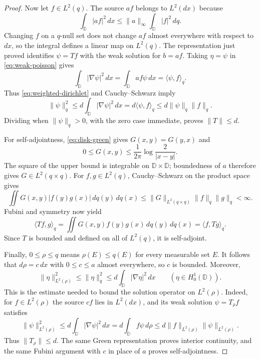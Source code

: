 \begin{proof}
Now let $f\in L^2(q)$. The source $af$ belongs to $L^2(dx)$ because
\[
 \int_{\mathbb D}|af|^2\,dx
 \le\|a\|_\infty\int_{\mathbb D}|f|^2\,dq.
\]
Changing $f$ on a $q$-null set does not change $af$ almost everywhere
with respect to $dx$, so the integral defines a linear map on $L^2(q)$.
The representation just proved identifies $\psi=Tf$ with the weak
solution for $b=af$. Taking $\eta=\psi$ in \cref{eq:weak-poisson}
gives
\[
 \int_{\mathbb D}|\nabla\psi|^2\,dx
 =\int_{\mathbb D}af\psi\,dx=\langle\psi,f\rangle_q.
\]
Thus \cref{eq:weighted-dirichlet} and Cauchy--Schwarz imply
\[
 \|\psi\|_q^2
 \le d\int_{\mathbb D}|\nabla\psi|^2\,dx
 =d\langle\psi,f\rangle_q
 \le d\|\psi\|_q\|f\|_q.
\]
Dividing when $\|\psi\|_q>0$, with the zero case immediate, proves
$\|T\|\le d$.

For self-adjointness, \cref{eq:disk-green} gives
$G(x,y)=G(y,x)$ and
\[
 0\le G(x,y)\le\frac1{2\pi}\log\frac2{|x-y|}.
\]
The square of the upper bound is integrable on
$\mathbb D\times\mathbb D$; boundedness of $a$ therefore gives
$G\in L^2(q\times q)$. For $f,g\in L^2(q)$, Cauchy--Schwarz on the
product space gives
\[
 \iint G(x,y)|f(y)g(x)|\,dq(y)\,dq(x)
 \le\|G\|_{L^2(q\times q)}\|f\|_q\|g\|_q<\infty.
\]
Fubini and symmetry now yield
\[
 \langle Tf,g\rangle_q
 =\iint G(x,y)f(y)g(x)\,dq(y)\,dq(x)
 =\langle f,Tg\rangle_q.
\]
Since $T$ is bounded and defined on all of $L^2(q)$, it is self-adjoint.

Finally, $0\le\rho\le q$ means $\rho(E)\le q(E)$ for every
measurable set $E$. It follows that $d\rho=c\,dx$ with
$0\le c\le a$ almost everywhere, so $c$ is bounded. Moreover,
\[
 \|\eta\|_{L^2(\rho)}^2
 \le\|\eta\|_q^2
 \le d\int_{\mathbb D}|\nabla\eta|^2\,dx
 \qquad(\eta\in H_0^1(\mathbb D)).
\]
This is the estimate needed to bound the solution operator on
$L^2(\rho)$. Indeed, for $f\in L^2(\rho)$ the source $cf$ lies in
$L^2(dx)$, and its weak solution $\psi=T_\rho f$ satisfies
\[
 \|\psi\|_{L^2(\rho)}^2
 \le d\int_{\mathbb D}|\nabla\psi|^2\,dx
 =d\int_{\mathbb D}f\psi\,d\rho
 \le d\|f\|_{L^2(\rho)}\|\psi\|_{L^2(\rho)}.
\]
Thus $\|T_\rho\|\le d$. The same Green representation proves
interior continuity, and the same Fubini argument with $c$ in place
of $a$ proves self-adjointness.
\end{proof}

